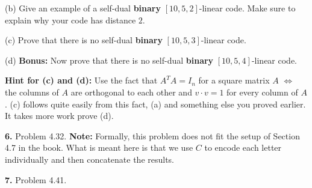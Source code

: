 \documentclass[12pt]{amsart}
\begin{document}
(b) Give an example of a self-dual {\bf binary} $[10,5,2]$-linear code. Make sure to explain why your code has distance $2$.
\skv

(c) Prove that there is no self-dual {\bf binary} $[10,5,3]$-linear code.
\skv

(d) {\bf Bonus:} Now prove that there is no self-dual {\bf binary} $[10,5,4]$-linear code. 
\skv

{\bf Hint for (c) and (d):} Use the fact that $A^T A=I_n$ for a square matrix $A$ 
$\iff$ the columns of $A$ are orthogonal to each other and $v\cdot v=1$ for every column of $A$. (c) follows quite easily from this fact, (a) and something else you proved earlier. It takes more work prove (d).
\skv

{\bf 6.} Problem 4.32. {\bf Note:} Formally, this problem does not fit the setup of Section 4.7 in the book. What is meant here is that we use $C$ to encode each letter individually and then concatenate the results.
\skv

{\bf 7.} Problem 4.41.
\end{document}
